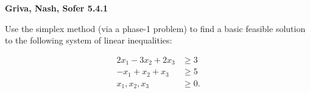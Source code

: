 \textbf{Griva, Nash, Sofer 5.4.1}

Use the simplex method (via a phase-1 problem) to find a basic feasible solution to the following system of linear 
inequalities:

\begin{align*}
  2x_1 - 3x_2 + 2x_3  & \ge 3 \\
  -x_1 +  x_2 +  x_3  & \ge 5 \\
  x_1, x_2, x_3 & \ge 0.
\end{align*}

\begin{solution}
  \ \\
\end{solution}
